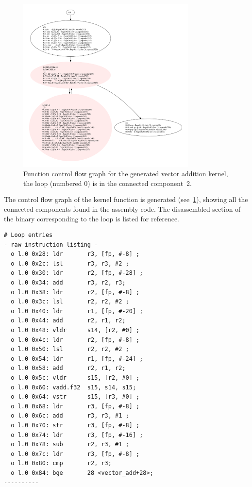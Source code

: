 \documentclass[11pt, a4paper, twoside]{montblanc2}
\begin{document}
\begin{figure}[h]
  \centering
\includegraphics[width=0.8\textwidth]{c_no_fpic}
\caption{Function control flow graph for the generated vector addition kernel, the loop (numbered 0) is in the connected component~2.}\label{fig:cfg_vec_add}
\end{figure}

The control flow graph of the kernel function is generated 
(see~\ref{fig:cfg_vec_add}), showing all the connected components found in the 
assembly code. The disassembled section of the binary corresponding to the loop 
is listed for reference.

\begin{verbatim}
# Loop entries
- raw instruction listing -
  o l.0 0x28: ldr       r3, [fp, #-8] ;
  o l.0 0x2c: lsl       r3, r3, #2 ;
  o l.0 0x30: ldr       r2, [fp, #-28] ;
  o l.0 0x34: add       r3, r2, r3;
  o l.0 0x38: ldr       r2, [fp, #-8] ;
  o l.0 0x3c: lsl       r2, r2, #2 ;
  o l.0 0x40: ldr       r1, [fp, #-20] ;
  o l.0 0x44: add       r2, r1, r2;
  o l.0 0x48: vldr      s14, [r2, #0] ;
  o l.0 0x4c: ldr       r2, [fp, #-8] ;
  o l.0 0x50: lsl       r2, r2, #2 ;
  o l.0 0x54: ldr       r1, [fp, #-24] ;
  o l.0 0x58: add       r2, r1, r2;
  o l.0 0x5c: vldr      s15, [r2, #0] ;
  o l.0 0x60: vadd.f32  s15, s14, s15;
  o l.0 0x64: vstr      s15, [r3, #0] ;
  o l.0 0x68: ldr       r3, [fp, #-8] ;
  o l.0 0x6c: add       r3, r3, #1 ;
  o l.0 0x70: str       r3, [fp, #-8] ;
  o l.0 0x74: ldr       r3, [fp, #-16] ;
  o l.0 0x78: sub       r2, r3, #1 ;
  o l.0 0x7c: ldr       r3, [fp, #-8] ;
  o l.0 0x80: cmp       r2, r3;
  o l.0 0x84: bge       28 <vector_add+28>;
----------
\end{verbatim}
\end{document}
